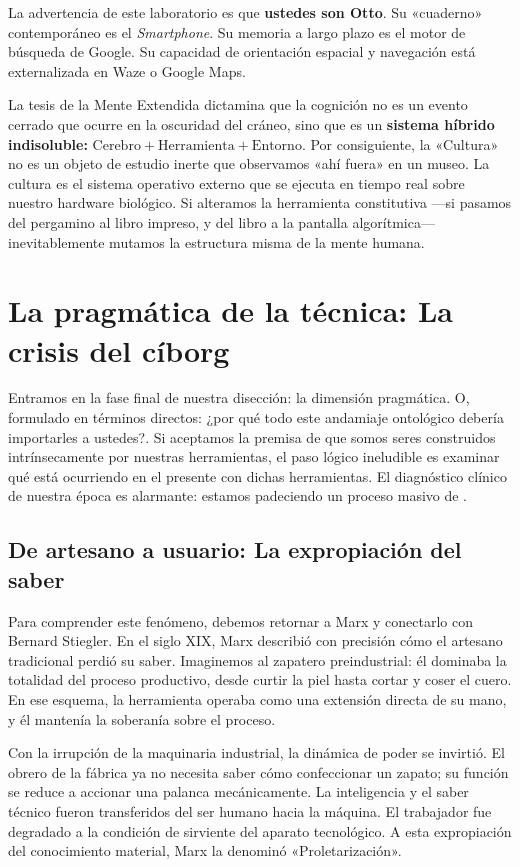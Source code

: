 La advertencia de este laboratorio es que \textbf{ustedes son Otto}. Su «cuaderno» contemporáneo es el \textit{Smartphone}. Su memoria a largo plazo es el motor de búsqueda de Google. Su capacidad de orientación espacial y navegación está externalizada en Waze o Google Maps.

La tesis de la Mente Extendida dictamina que la cognición no es un evento cerrado que ocurre en la oscuridad del cráneo, sino que es un \textbf{sistema híbrido indisoluble:} $\text{Cerebro} + \text{Herramienta} + \text{Entorno}$. Por consiguiente, la «Cultura» no es un objeto de estudio inerte que observamos «ahí fuera» en un museo. La cultura es el sistema operativo externo que se ejecuta en tiempo real sobre nuestro hardware biológico. Si alteramos la herramienta constitutiva —si pasamos del pergamino al libro impreso, y del libro a la pantalla algorítmica— inevitablemente mutamos la estructura misma de la mente humana.

\section{La pragmática de la técnica: La crisis del cíborg}

Entramos en la fase final de nuestra disección: la dimensión pragmática. O, formulado en términos directos: ¿por qué todo este andamiaje ontológico debería importarles a ustedes?. Si aceptamos la premisa de que somos seres construidos intrínsecamente por nuestras herramientas, el paso lógico ineludible es examinar qué está ocurriendo en el presente con dichas herramientas. El diagnóstico clínico de nuestra época es alarmante: estamos padeciendo un proceso masivo de \Proletarizacion{}.

\subsection{De artesano a usuario: La expropiación del saber}

Para comprender este fenómeno, debemos retornar a Marx y conectarlo con Bernard Stiegler. En el siglo XIX, Marx describió con precisión cómo el artesano tradicional perdió su saber. Imaginemos al zapatero preindustrial: él dominaba la totalidad del proceso productivo, desde curtir la piel hasta cortar y coser el cuero. En ese esquema, la herramienta operaba como una extensión directa de su mano, y él mantenía la soberanía sobre el proceso.

Con la irrupción de la maquinaria industrial, la dinámica de poder se invirtió. El obrero de la fábrica ya no necesita saber cómo confeccionar un zapato; su función se reduce a accionar una palanca mecánicamente. La inteligencia y el saber técnico fueron transferidos del ser humano hacia la máquina. El trabajador fue degradado a la condición de sirviente del aparato tecnológico. A esta expropiación del conocimiento material, Marx la denominó «Proletarización».

